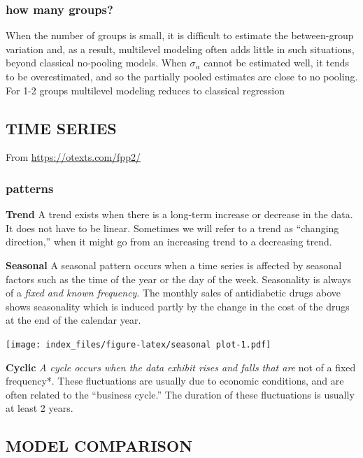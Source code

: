 \documentclass[
]{article}
\begin{document}
\hypertarget{how-many-groups}{%
\subsubsection{how many groups?}\label{how-many-groups}}

When the number of groups is small, it is difficult to estimate the
between-group variation and, as a result, multilevel modeling often adds
little in such situations, beyond classical no-pooling models. When
\(\sigma_{\alpha}\) cannot be estimated well, it tends to be
overestimated, and so the partially pooled estimates are close to no
pooling. For 1-2 groups multilevel modeling reduces to classical
regression

\hypertarget{time-series}{%
\subsection{\texorpdfstring{\textbf{TIME
SERIES}}{TIME SERIES}}\label{time-series}}

From \url{https://otexts.com/fpp2/}

\hypertarget{patterns}{%
\subsubsection{patterns}\label{patterns}}

\textbf{Trend} A trend exists when there is a long-term increase or
decrease in the data. It does not have to be linear. Sometimes we will
refer to a trend as ``changing direction,'' when it might go from an
increasing trend to a decreasing trend.

\textbf{Seasonal} A seasonal pattern occurs when a time series is
affected by seasonal factors such as the time of the year or the day of
the week. Seasonality is always of a \emph{fixed and known frequency}.
The monthly sales of antidiabetic drugs above shows seasonality which is
induced partly by the change in the cost of the drugs at the end of the
calendar year.

\texttt{[image: index\_files/figure-latex/seasonal plot-1.pdf]}

\textbf{Cyclic}\emph{ A cycle occurs when the data exhibit rises and
falls that are }not of a fixed frequency*. These fluctuations are
usually due to economic conditions, and are often related to the
``business cycle.'' The duration of these fluctuations is usually at
least 2 years.

\hypertarget{model-comparison}{%
\subsection{\texorpdfstring{\textbf{MODEL
COMPARISON}}{MODEL COMPARISON}}\label{model-comparison}}
\end{document}

